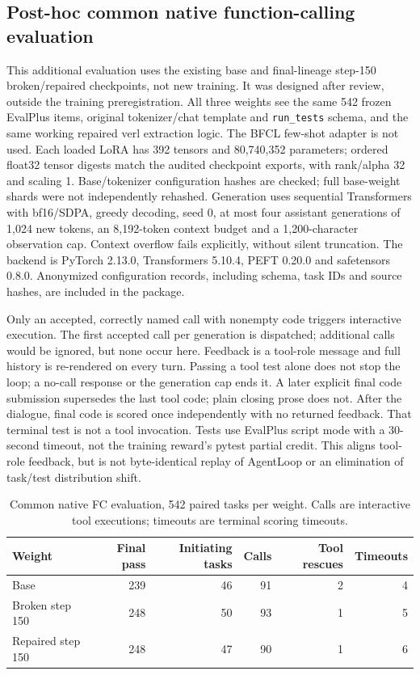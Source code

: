 \subsection{Post-hoc common native function-calling evaluation}
\label{app:nativefc}

This additional evaluation uses the existing base and final-lineage step-150
broken/repaired checkpoints, not new training. It was designed after review, outside
the training preregistration. All three weights see the same 542 frozen EvalPlus
items, original tokenizer/chat template and \texttt{run\_tests} schema, and the same
working repaired verl extraction logic. The BFCL few-shot adapter is not used.
Each loaded LoRA has 392 tensors and 80,740,352 parameters; ordered float32 tensor
digests match the audited checkpoint exports, with rank/alpha 32 and scaling 1.
Base/tokenizer configuration hashes are checked; full base-weight shards were not
independently rehashed. Generation uses sequential Transformers with bf16/SDPA,
greedy decoding, seed 0, at most four assistant generations of 1,024 new tokens,
an 8,192-token context budget and a 1,200-character observation cap. Context overflow
fails explicitly, without silent truncation. The backend is PyTorch 2.13.0, Transformers 5.10.4, PEFT 0.20.0 and safetensors 0.8.0.
Anonymized configuration records, including schema, task IDs and source hashes,
are included in the package.

Only an accepted, correctly named call with nonempty code triggers interactive
execution. The first accepted call per generation is dispatched; additional calls
would be ignored, but none occur here. Feedback is a tool-role message and full
history is re-rendered on every turn. Passing a tool test alone does not stop the
loop; a no-call response or the generation cap ends it. A later explicit final
code submission supersedes the last tool code; plain closing prose does not.
After the dialogue, final code is scored once independently with no returned
feedback. That terminal test is not a tool invocation. Tests use EvalPlus script
mode with a 30-second timeout, not the training reward's pytest partial credit.
This aligns tool-role feedback, but is not byte-identical replay of AgentLoop or
an elimination of task/test distribution shift.

\begin{table}[htbp]
\centering
\caption{Common native FC evaluation, 542 paired tasks per weight. Calls are
interactive tool executions; timeouts are terminal scoring timeouts.}
\label{tab:nativefc}
\small
\begin{tabular}{lrrrrr}
\toprule
Weight & Final pass & Initiating tasks & Calls & Tool rescues & Timeouts \\
\midrule
Base & 239 & 46 & 91 & 2 & 4 \\
Broken step 150 & 248 & 50 & 93 & 1 & 5 \\
Repaired step 150 & 248 & 47 & 90 & 1 & 6 \\
\bottomrule
\end{tabular}
\end{table}


